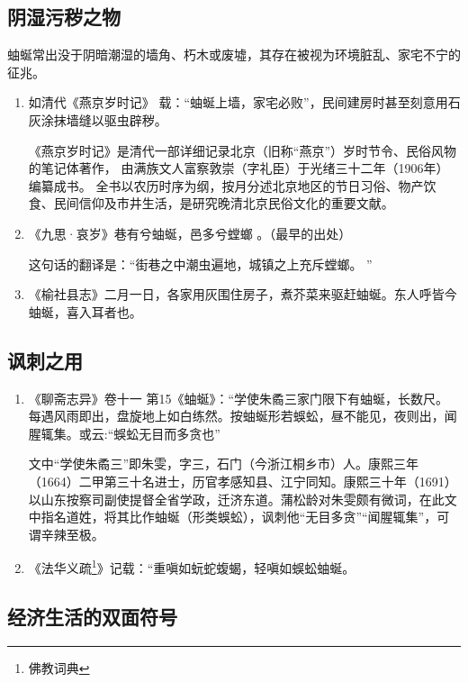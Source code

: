 \subsection{阴湿污秽之物}
蚰蜒常出没于阴暗潮湿的墙角、朽木或废墟，其存在被视为环境脏乱、家宅不宁的征兆。
\begin{enumerate}
    \item 如清代《燕京岁时记》 载：``蚰蜒上墙，家宅必败''，民间建房时甚至刻意用石灰涂抹墙缝以驱虫辟秽。

    《燕京岁时记》是清代一部详细记录北京（旧称``燕京''）岁时节令、民俗风物的笔记体著作，
    由满族文人富察敦崇（字礼臣）于光绪三十二年（1906年）编纂成书。
    全书以农历时序为纲，按月分述北京地区的节日习俗、物产饮食、民间信仰及市井生活，是研究晚清北京民俗文化的重要文献。

    \item 《九思·哀岁》巷有兮蚰蜒，邑多兮螳螂 。（最早的出处）

    这句话的翻译是：``街巷之中潮虫遍地，城镇之上充斥螳螂。 ''

    \item 《榆社县志》二月一日，各家用灰围住房子，煮芥菜来驱赶蚰蜒。东人呼皆今蚰蜒，喜入耳者也。
\end{enumerate}

\subsection{讽刺之用}

\begin{enumerate}
    \item 《聊斋志异》卷十一 第15《蚰蜒》：``学使朱矞三家门限下有蚰蜒，长数尺。每遇风雨即出，盘旋地上如白练然。按蚰蜒形若蜈蚣，昼不能见，夜则出，闻腥辄集。或云:``蜈蚣无目而多贪也''

    文中``学使朱矞三''即朱雯，字三，石门（今浙江桐乡市）人。康熙三年（1664）二甲第三十名进士，历官孝感知县、江宁同知。康熙三十年（1691）以山东按察司副使提督全省学政，迁济东道。蒲松龄对朱雯颇有微词，在此文中指名道姓，将其比作蚰蜒（形类蜈蚣），讽刺他``无目多贪''``闻腥辄集''，可谓辛辣至极。

    \item 《法华义疏\footnote{佛教词典}》记载：``重嗔如蚖蛇蝮蝎，轻嗔如蜈蚣蚰蜒。
\end{enumerate}

\subsection{经济生活的双面符号}

